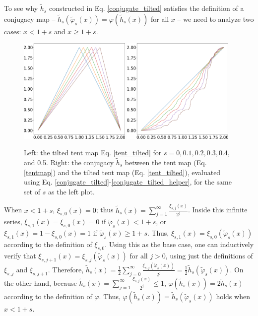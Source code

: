 \documentclass[preprint,12pt]{elsarticle}
\begin{document}
To see why $\tilde{h}_s$ constructed in Eq. \ref{conjugate_tilted} satisfies the definition of a conjugacy map --
$\tilde{h}_s(\tilde\varphi_s(x)) = \varphi(\tilde{h}_s(x))$ for all $x$ --
we need to analyze two cases: $x<1+s$ and $x\ge 1+s$.
\begin{figure}
  \centering
    \includegraphics[width=0.48\textwidth]{tilted_tent_map.png}
    \hspace{0.02\textwidth}
    \includegraphics[width=0.48\textwidth]{tilted_conjugate_map.png}
    \\ \vspace{0.02\textwidth}
     \caption{Left: the tilted tent map Eq. \ref{tent_tilted} for $s=0, 0.1, 0.2, 0.3, 0.4,$ and 0.5. Right: the conjugacy $\tilde{h}_s$ between the tent map (Eq. \ref{tentmap})
    and the tilted tent map (Eq. \ref{tent_tilted}), evaluated using
    Eq. \ref{conjugate_tilted}-\ref{conjugate_tilted_helper}, for the same set of $s$ as the
    left plot.}
     \label{fig:tilted_tent_conjugate}
\end{figure}
When $x<1+s$, $\xi_{s,0}(x)=0$; thus
$\tilde{h}_s(x) = \sum_{j=1}^{\infty} \frac{\xi_{s,j}(x)}{2^j}$.
Inside this infinite series, $\xi_{s,1}(x)=\xi_{s,0}(x)=0$ if $\tilde\varphi_s(x)<1+s$,
or $\xi_{s,1}(x)=1-\xi_{s,0}(x)=1$ if $\tilde\varphi_s(x)\ge 1+s$.
Thus, $\xi_{s,1}(x) = \xi_{s,0}(\tilde{\varphi}_s(x))$ according to the definition of $\xi_{s,0}$.
Using this as the base case, one can inductively verify that
$\xi_{s,j+1}(x) = \xi_{s,j}(\tilde\varphi_s(x))$
for all $j>0$, using just the definitions of $\xi_{s,j}$ and $\xi_{s,j+1}$.
Therefore,
$\tilde{h}_s(x) = \frac12 \sum_{j=0}^{\infty} \frac{\xi_{s,j}(\tilde\varphi_s(x))}{2^j}
=\frac12 \tilde{h}_s(\tilde\varphi_s(x))$.
On the other hand, because
$\tilde{h}_s(x) = \sum_{j=1}^{\infty} \frac{\xi_{s,j}(x)}{2^j}\le1$,
$\varphi(\tilde{h}_s(x)) = 2\tilde{h}_s(x)$ according
to the definition of $\varphi$.  Thus,
$\varphi(\tilde{h}_s(x)) = \tilde{h}_s(\tilde\varphi_s(x))$ holds when $x<1+s$.
\end{document}

